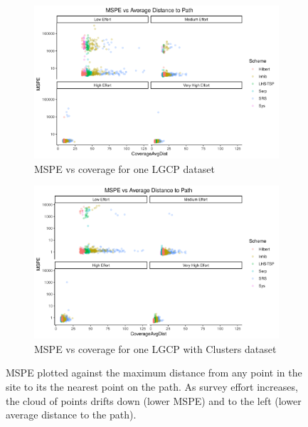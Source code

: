 \documentclass[review]{elsarticle}
\begin{document}
\begin{figure}

\begin{subfigure}{4.5in}
\includegraphics[width=4.5in]{../graphics/MSPE-Coverage-LGCP000004.png}
\caption{MSPE vs coverage for one LGCP dataset}
\label{covglgcp}
\end{subfigure}

\begin{subfigure}{4.5in}
\includegraphics[width=4.5in]{../graphics/MSPE-Coverage-Cluster000004.png}
\caption{MSPE vs coverage for one LGCP with Clusters dataset}
\label{covgclust}
\end{subfigure}

\caption{MSPE plotted against the maximum distance from any point in the site
to its the nearest point on the path. As survey effort increases, the cloud of
points drifts down (lower MSPE) and to the left (lower average distance to the
path).}
\label{covg}
\end{figure}

\end{document}
